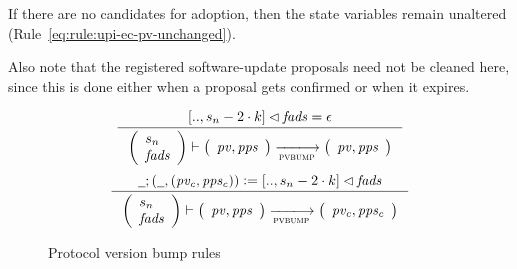 If there are no candidates for adoption, then the state variables remain
unaltered (Rule~\ref{eq:rule:upi-ec-pv-unchanged}).

Also note that the registered software-update proposals need not be cleaned
here, since this is done either when a proposal gets confirmed or when it
expires.

\begin{figure}[htb]
  \begin{equation}
    \label{eq:rule:pvbump-change-epoch-only}
    \inference
    {
      [.., s_n - 2 \cdot k] \restrictdom \var{fads} = \epsilon
    }
    {
      {\left(\begin{array}{l}
         s_n\\
         \var{fads}
       \end{array}\right)}
      \vdash
      {
        \left(
          \begin{array}{l}
            \var{pv}, \var{pps}\\
          \end{array}
        \right)
      }
      \trans{pvbump}{}
      {
        \left(
          \begin{array}{l}
            \var{pv}, \var{pps}\\
          \end{array}
        \right)
      }
    }
  \end{equation}
  \nextdef
  \begin{equation}
    \label{eq:rule:pvbump-change}
    \inference
    {
      \wcard ; (\wcard , (\var{pv_c}, \var{pps_c})) \leteq [.., s_n - 2 \cdot k] \restrictdom \var{fads}
    }
    {
      {\left(\begin{array}{l}
         s_n\\
         \var{fads}
       \end{array}\right)}
      \vdash
      {
        \left(
          \begin{array}{l}
            \var{pv}, \var{pps}\\
          \end{array}
        \right)
      }
      \trans{pvbump}{}
      {
        \left(
          \begin{array}{l}
            \var{pv_c}, \var{pps_c}\\
          \end{array}
        \right)
      }
    }
  \end{equation}
  \caption{Protocol version bump rules}
  \label{fig:rules:pvbump}
\end{figure}

